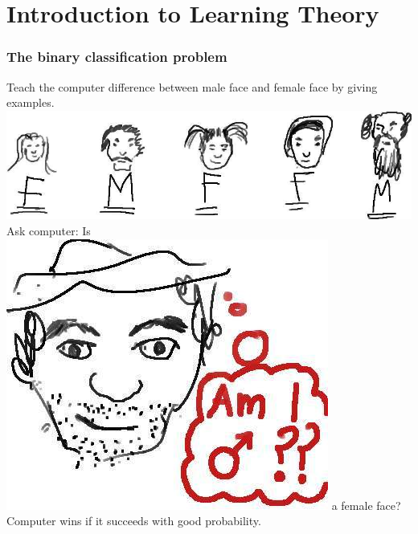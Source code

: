 \documentclass{beamer}
\begin{document}
\section{Introduction to Learning Theory}
\begin{frame}
\frametitle{The binary classification problem}
\begin{itemize}
 \pitem Teach the computer difference between male face and female face by giving examples.\\
\includegraphics[scale=0.25]{images/classifiedFaces.jpg}
 \pitem Ask computer: Is \includegraphics[scale=0.125]{images/maleFace.jpg} a female face?
 \pitem Computer wins if it succeeds with good probability.
\end{itemize}
\end{frame}
\end{document}
